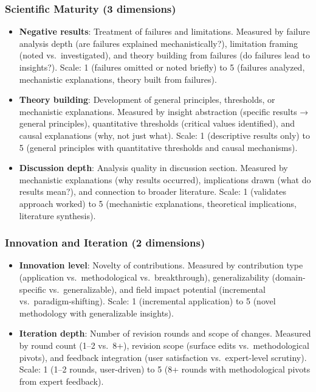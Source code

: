 \subsubsection{Scientific Maturity (3 dimensions)}

\begin{itemize}[leftmargin=*]
\item \textbf{Negative results}: Treatment of failures and limitations. Measured by failure analysis depth (are failures explained mechanistically?), limitation framing (noted vs.\ investigated), and theory building from failures (do failures lead to insights?). Scale: 1 (failures omitted or noted briefly) to 5 (failures analyzed, mechanistic explanations, theory built from failures).

\item \textbf{Theory building}: Development of general principles, thresholds, or mechanistic explanations. Measured by insight abstraction (specific results → general principles), quantitative thresholds (critical values identified), and causal explanations (why, not just what). Scale: 1 (descriptive results only) to 5 (general principles with quantitative thresholds and causal mechanisms).

\item \textbf{Discussion depth}: Analysis quality in discussion section. Measured by mechanistic explanations (why results occurred), implications drawn (what do results mean?), and connection to broader literature. Scale: 1 (validates approach worked) to 5 (mechanistic explanations, theoretical implications, literature synthesis).
\end{itemize}

\subsubsection{Innovation and Iteration (2 dimensions)}

\begin{itemize}[leftmargin=*]
\item \textbf{Innovation level}: Novelty of contributions. Measured by contribution type (application vs.\ methodological vs.\ breakthrough), generalizability (domain-specific vs.\ generalizable), and field impact potential (incremental vs.\ paradigm-shifting). Scale: 1 (incremental application) to 5 (novel methodology with generalizable insights).

\item \textbf{Iteration depth}: Number of revision rounds and scope of changes. Measured by round count (1--2 vs.\ 8+), revision scope (surface edits vs.\ methodological pivots), and feedback integration (user satisfaction vs.\ expert-level scrutiny). Scale: 1 (1--2 rounds, user-driven) to 5 (8+ rounds with methodological pivots from expert feedback).
\end{itemize}

